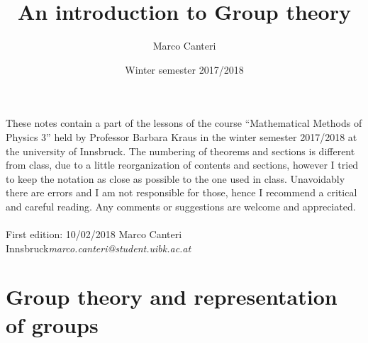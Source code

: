 \documentclass[12pt]{book}
\title{\textbf{An introduction to Group theory}}
\author{Marco Canteri}
\date{Winter semester 2017/2018}
\theoremstyle{plain}
\theoremstyle{definition}
\theoremstyle{remark}
\begin{document}
\maketitle
These notes contain a part of the lessons of the course ``Mathematical Methods of Physics 3'' held by Professor Barbara Kraus in the winter semester 2017/2018 at the university of Innsbruck. The numbering of theorems and sections is different from class, due to a little reorganization of contents and sections, however I tried to keep the notation as close as possible to the one used in class. Unavoidably there are errors and I am not responsible for those, hence I recommend a critical and careful reading. Any comments or suggestions are welcome and appreciated.\\ \\
First edition: 10/02/2018 \hfill Marco Canteri \\
Innsbruck\hfill \textit{marco.canteri@student.uibk.ac.at}\\
\tableofcontents
\chapter{Group theory and representation of groups}
\end{document}
